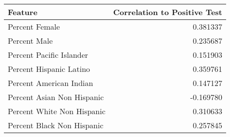 \begin{tabular}{lr}
    \toprule
    {Feature}                           & Correlation to Positive Test \\
    \midrule
    Percent Female                      & 0.381337                     \\
    Percent Male                        & 0.235687                     \\
    Percent Pacific Islander            & 0.151903                     \\
    Percent Hispanic Latino             & 0.359761                     \\
    Percent American Indian             & 0.147127                     \\
    Percent Asian Non Hispanic          & -0.169780                    \\
    Percent White Non Hispanic          & 0.310633                     \\
    Percent Black Non Hispanic          & 0.257845                     \\

\end{tabular}
